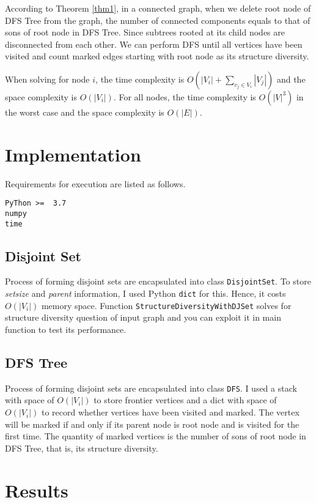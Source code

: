 \documentclass{article}
\begin{document}
	According to Theorem \ref{thm1}, in a connected graph, when we delete root node of DFS Tree from the graph, the number of connected components equals to that of sons of root node in DFS Tree. Since subtrees rooted at its child nodes are disconnected from each other. We can perform DFS until all vertices have been visited and count marked edges starting with root node as its structure diversity. 
	
	When solving for node $i$, the time complexity is $O(|V_i| + \sum_{v_j \in V_i}^{} |V_j|)$ and the space complexity is $O(|V_i|)$. For all nodes, the time complexity is $O(|V|^3)$ in the worst case and the space complexity is $O(|E|)$.

	\section{Implementation} \label{sec:imple}
	Requirements for execution are listed as follows.
	\vspace{0.5em}
	\begin{lstlisting}
PyThon >=  3.7
numpy
time
	\end{lstlisting}
	
	\subsection{Disjoint Set} 
	Process of forming disjoint sets are encapsulated into class \texttt{DisjointSet}. To store \textit{setsize} and \textit{parent} information, I used Python \texttt{dict} for this. Hence, it costs $O(|V_i|)$ memory space. Function \texttt{StructureDiversityWithDJSet} solves for structure diversity question of input graph and you can exploit it in main function to test its performance.
	   
	\subsection{DFS Tree}
	Process of forming disjoint sets are encapsulated into class \texttt{DFS}. I used a stack with space of $O(|V_i|)$ to store frontier vertices and a dict with space of $O(|V_i|)$ to record whether vertices have been visited and marked. The vertex will be marked if and only if its parent node is root node and is visited for the first time. The quantity of marked vertices is the number of sons of root node in DFS Tree, that is, its structure diversity. 
	
	\section{Results} \label{sec:result}
	
\end{document}
